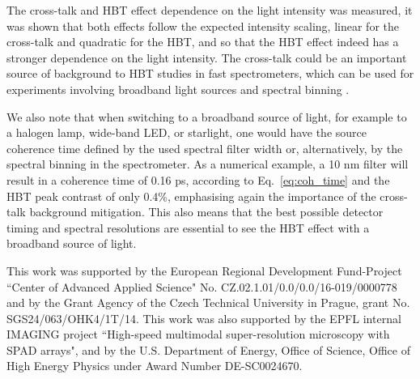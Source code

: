 \documentclass[a4paper,11pt]{article}
\begin{document}
The cross-talk and HBT effect dependence on the light intensity was measured,
it was shown that both effects follow the expected intensity scaling, linear for the cross-talk and quadratic for the HBT, and so that the HBT effect indeed has a stronger dependence on the light intensity. 
The cross-talk could be an important source of background to HBT studies in fast spectrometers, which can be used for experiments involving broadband light sources and spectral binning \cite{Farella2024, jirsa2023fast, ferrantini2024multifrequencyresolved, iso2024capturing}.

We also note that when switching to a broadband source of light, for example to a halogen lamp, wide-band LED, or starlight, one would have the source coherence time defined by the used spectral filter width or, alternatively, by the spectral binning in the spectrometer. As a numerical example, a 10 nm filter will result in a coherence time of 0.16 ps, according to Eq.~\eqref{eq:coh_time} and the HBT peak contrast of only 0.4\%, emphasising again the importance of the cross-talk background mitigation. This also means that the best possible detector timing and spectral resolutions are essential to see the HBT effect with a broadband source of light.

\acknowledgments

This work was supported by the European Regional Development Fund-Project ``Center of Advanced Applied Science" No. CZ.02.1.01/0.0/0.0/16-019/0000778 and by the Grant Agency of the Czech Technical University in Prague, grant No. SGS24/063/OHK4/1T/14. This work was also supported by the EPFL internal IMAGING project ``High-speed multimodal super-resolution microscopy with SPAD arrays", and by the U.S. Department of Energy, Office of Science, Office of High Energy Physics under Award Number DE-SC0024670.




\end{document}
